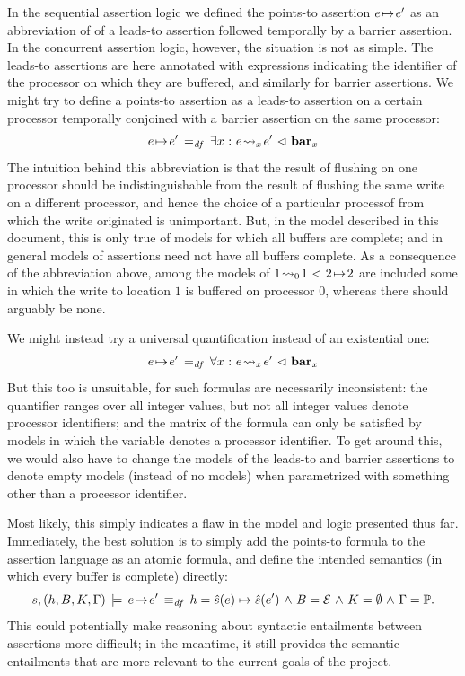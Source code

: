 \documentclass[11pt]{report}
\begin{document}
In the sequential assertion logic we defined the points-to assertion $e \!\mapsto\! e'$ as an abbreviation of of a leads-to assertion followed temporally by a barrier assertion. In the concurrent assertion logic, however, the situation is not as simple. The leads-to assertions are here annotated with expressions indicating the identifier of the processor on which they are buffered, and similarly for barrier assertions. We might try to define a points-to assertion as a leads-to assertion on a certain processor temporally conjoined with a barrier assertion on the same processor: \[
  e \!\mapsto\! e' \operatorname{\;=_{\mathit{df}}\;} \exists x \operatorname{\,:\,} e \!\leadsto_{x}\! e' \operatorname{\,\vartriangleleft\,} \mathbf{bar}_{x}
\] The intuition behind this abbreviation is that the result of flushing on one processor should be indistinguishable from the result of flushing the same write on a different processor, and hence the choice of a particular processof from which the write originated is unimportant. But, in the model described in this document, this is only true of models for which all buffers are complete; and in general models of assertions need not have all buffers complete. As a consequence of the abbreviation above, among the models of $1 \!\leadsto_{0}\! 1 \operatorname{\,\vartriangleleft\,} 2 \!\mapsto\! 2$ are included some in which the write to location $1$ is buffered on processor 0, whereas there should arguably be none. 

We might instead try a universal quantification instead of an existential one: \[e \!\mapsto\! e' \operatorname{\;=_{\mathit{df}}\;} \forall x \operatorname{\,:\,} e \!\leadsto_{x}\! e' \operatorname{\,\vartriangleleft\,} \mathbf{bar}_{x} \] But this too is unsuitable, for such formulas are necessarily inconsistent: the quantifier ranges over all integer values, but not all integer values denote processor identifiers; and the matrix of the formula can only be satisfied by models in which the variable denotes a processor identifier. To get around this, we would also have to change the models of the leads-to and barrier assertions to denote empty models (instead of no models) when parametrized with something other than a processor identifier. 

Most likely, this simply indicates a flaw in the model and logic presented thus far. Immediately, the best solution is to simply add the points-to formula to the assertion language as an atomic formula, and define the intended semantics (in which every buffer is complete) directly: \[ s,(h,B,K,\Gamma) \,\models\, e \!\mapsto\! e' \operatorname{\;\equiv_{\mathit{df}}\;} h = \hat{s}(e) \mapsto \hat{s}(e') \operatorname{\,\wedge\,} B = \mathcal{E} \operatorname{\,\wedge\,} K = \operatorname{\emptyset} \operatorname{\,\wedge\,} \Gamma = \mathbb{P}.\] This could potentially make reasoning about syntactic entailments between assertions more difficult; in the meantime, it still provides the semantic entailments that are more relevant to the current goals of the project. 
\end{document}
